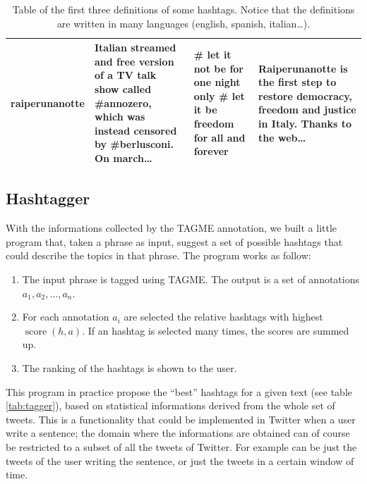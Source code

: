 \documentclass[a4paper,11pt,oneside]{article}
\DeclareMathOperator{\score}{score}
\begin{document}
\begin{table}[h]
\begin{tabular}{ | l | p{4cm} | p{4cm} | p{4cm} |}
raiperunanotte & \footnotesize{Italian streamed and free version of a TV talk show called \#annozero, which was instead censored by \#berlusconi. On march\dots} & \footnotesize{\# let it not be for one night only \# let it be freedom for all and forever} & \footnotesize{Raiperunanotte is the first step to restore democracy, freedom and justice in Italy. Thanks to the web\dots}\\
 \hline
    \end{tabular}
    \caption{Table of the first three definitions of some hashtags. Notice that the definitions are written in many languages (english, spanish, italian\dots).}
    \label{tab:hashDef}
\end{table}


\subsection{Hashtagger}
\label{sec:tagger}
With the informations collected by the TAGME annotation, we built a little program that, taken a phrase as input, suggest a set of possible hashtags that could describe the topics in that phrase.
The program works as follow:
\begin{enumerate}
\item The input phrase is tagged using TAGME. The output is a set of annotations $a_1, a_2,\ldots, a_n$.
\item For each annotation $a_i$ are selected the relative hashtags with highest $\score(h,a)$. If an hashtag is selected many times, the scores are summed up.
\item The ranking of the hashtags is shown to the user.
\end{enumerate}

This program in practice propose the ``best'' hashtags for a given text (see table \ref{tab:tagger}), based on statistical informations derived from the whole set of tweets. This is a functionality that could be implemented in Twitter when a user write a sentence; the domain where the informations are obtained can of course be restricted to a subset of all the tweets of Twitter. For example  can be just the tweets of the user writing the sentence, or just the tweets in a certain window of time.  
\end{document}
